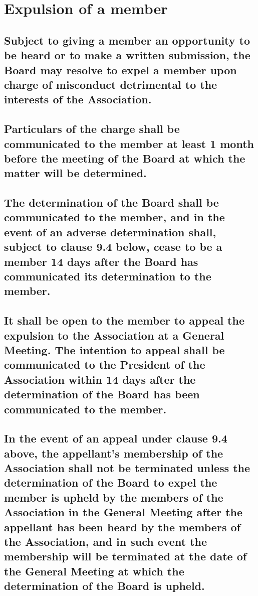 \documentclass{article}
\newenvironment{subs}
  {\adjustwidth{2em}{0pt}}
  {\endadjustwidth}
\begin{document}
\section{Expulsion of a member}
\begin{subs}
\subsection{Subject to giving a member an opportunity to be heard or to make a written submission, the Board may resolve to expel a member upon charge of misconduct detrimental to the interests of the Association.}
\subsection{Particulars of the charge shall be communicated to the member at least 1 month before the meeting of the Board at which the matter will be determined.}
\subsection{The determination of the Board shall be communicated  to the member, and in the event of an adverse determination shall, subject to clause 9.4 below, cease to be a member 14 days after the Board has communicated its determination to the member.}
\newpage

\subsection{It shall be open to the member to appeal the expulsion to the Association at a General Meeting. The intention to appeal shall be communicated to the President of the Association within 14 days after the determination of the Board has been communicated to the member.}
\subsection{In the event of an appeal under clause 9.4 above, the appellant's membership of the Association shall not be terminated unless the determination of the Board to expel the member is upheld by the members of the Association in the General Meeting after the appellant has been heard by the members of the Association, and in such event the membership will be terminated at the date of the General Meeting at which the determination of the Board is upheld.}
\end{subs}
\end{document}

